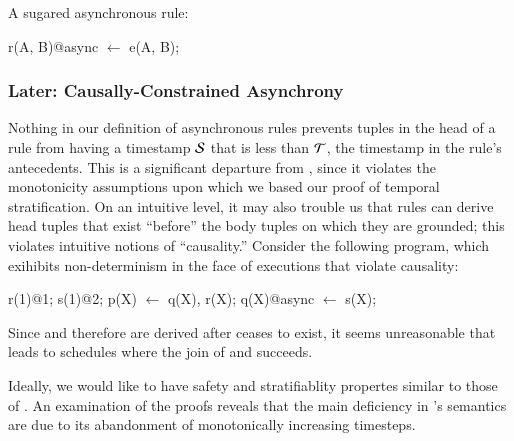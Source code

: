 \begin{example}
	A sugared asynchronous \lang rule:
	
\begin{Dedalus}
r(A, B)@async \(\leftarrow\) e(A, B);
\end{Dedalus}
\end{example}


\subsubsection{Later: Causally-Constrained Asynchrony}



Nothing in our definition of asynchronous rules prevents tuples in the
head of a rule from having a timestamp $\SDedalus$ that is less than
$\Tau$, the timestamp in the rule's antecedents. This is a significant
departure from \slang, since it violates the monotonicity assumptions
upon which we based our proof of temporal stratification.  On an
intuitive level, it may also trouble us that rules can derive head
tuples that exist ``before'' the body tuples on which they are
grounded; this violates intuitive notions of ``causality.''  Consider
the following program, which exihibits non-determinism in the face of
executions that violate causality:

\begin{Dedalus}
r(1)@1;
s(1)@2;
p(X) \(\leftarrow\) q(X), r(X);
q(X)@async \(\leftarrow\) s(X);
\end{Dedalus}

Since  and therefore  are derived after
 ceases to exist, it seems unreasonable that
 leads to schedules where the join of 
and  succeeds.

Ideally, we would like \lang to have safety and stratifiablity
propertes similar to those of \slang.  An examination of the proofs
 reveals
that the main deficiency in \lang's semantics are due to its
abandonment of monotonically increasing timesteps.

